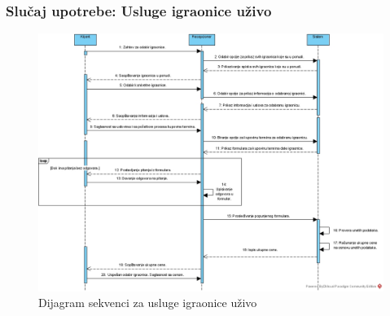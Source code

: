 \documentclass[a4paper]{article}
\begin{document}
\subsubsection{Slučaj upotrebe: Usluge igraonice uživo}

\begin{figure}[!ht]
\begin{center}
\includegraphics[scale=0.55]{sections/images/dijagram_sekvenci_usluge_igraonice_uzivo.jpg}
\end{center}
\caption{Dijagram sekvenci za usluge igraonice uživo}
\label{fig:kontekst}
\end{figure}
\end{document}
